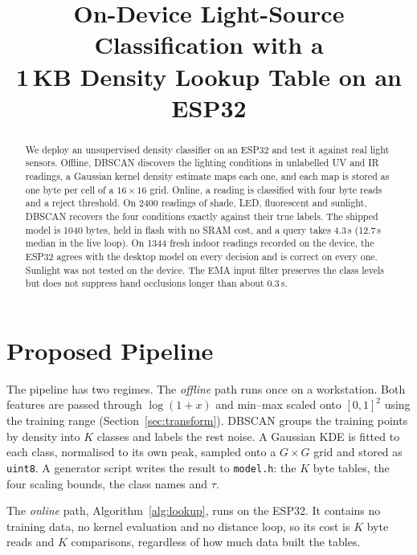 \documentclass[conference]{IEEEtran}
\title{On-Device Light-Source Classification with a\\1\,KB Density Lookup Table on an ESP32}
\author{\IEEEauthorblockN{Gib Macarine}
        \IEEEauthorblockA{Department of Computer Engineering\\
                          Vanier College}}
\begin{document}
\maketitle

\begin{abstract}
We deploy an unsupervised density classifier on an ESP32 and test it against real light sensors. Offline, DBSCAN discovers the lighting conditions in unlabelled UV and IR readings, a Gaussian kernel density estimate maps each one, and each map is stored as one byte per cell of a $16\times16$ grid. Online, a reading is classified with four byte reads and a reject threshold. On 2400 readings of shade, LED, fluorescent and sunlight, DBSCAN recovers the four conditions exactly against their true labels. The shipped model is 1040 bytes, held in flash with no SRAM cost, and a query takes 4.3\,\textmu s (12.7\,\textmu s median in the live loop). On 1344 fresh indoor readings recorded on the device, the ESP32 agrees with the desktop model on every decision and is correct on every one. Sunlight was not tested on the device. The EMA input filter preserves the class levels but does not suppress hand occlusions longer than about 0.3\,s.
\end{abstract}

\section{Proposed Pipeline}

The pipeline has two regimes. The \emph{offline} path runs once on a workstation. Both features are passed through $\log(1+x)$ and min--max scaled onto $[0,1]^2$ using the training range (Section~\ref{sec:transform}). DBSCAN groups the training points by density into $K$ classes and labels the rest noise. A Gaussian KDE is fitted to each class, normalised to its own peak, sampled onto a $G\times G$ grid and stored as \texttt{uint8}. A generator script writes the result to \texttt{model.h}: the $K$ byte tables, the four scaling bounds, the class names and $\tau$.

The \emph{online} path, Algorithm~\ref{alg:lookup}, runs on the ESP32. It contains no training data, no kernel evaluation and no distance loop, so its cost is $K$ byte reads and $K$ comparisons, regardless of how much data built the tables.
\end{document}

